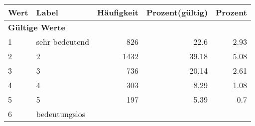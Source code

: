      \begin{longtable}{lXrrr}
     \toprule
     \textbf{Wert} & \textbf{Label} & \textbf{Häufigkeit} & \textbf{Prozent(gültig)} & \textbf{Prozent} \\
     \endhead
     \midrule
     \multicolumn{5}{l}{\textbf{Gültige Werte}}\\

     1 &
     \multicolumn{1}{X}{ sehr bedeutend   } &


       \num{826} &
       \num[round-mode=places,round-precision=2]{22,6} &
         \num[round-mode=places,round-precision=2]{2,93} \\

     2 &
     \multicolumn{1}{X}{ 2   } &


       \num{1432} &
       \num[round-mode=places,round-precision=2]{39,18} &
         \num[round-mode=places,round-precision=2]{5,08} \\

     3 &
     \multicolumn{1}{X}{ 3   } &


       \num{736} &
       \num[round-mode=places,round-precision=2]{20,14} &
         \num[round-mode=places,round-precision=2]{2,61} \\

     4 &
     \multicolumn{1}{X}{ 4   } &


       \num{303} &
       \num[round-mode=places,round-precision=2]{8,29} &
         \num[round-mode=places,round-precision=2]{1,08} \\

     5 &
     \multicolumn{1}{X}{ 5   } &


       \num{197} &
       \num[round-mode=places,round-precision=2]{5,39} &
         \num[round-mode=places,round-precision=2]{0,7} \\

     6 &
     \multicolumn{1}{X}{ bedeutungslos   } &



\end{longtable}

